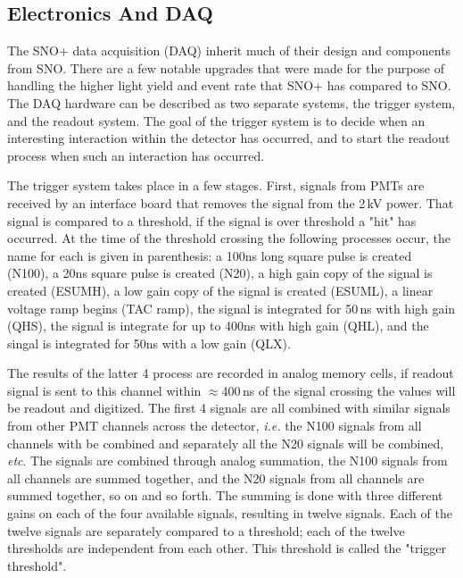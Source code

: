 \subsection{Electronics And DAQ}
The SNO+ data acquisition (DAQ) inherit much of their design and components from
SNO.
There are a few notable upgrades that were made for the purpose of handling the
higher light yield and event rate that SNO+ has compared to SNO.
The DAQ hardware can be described as two separate systems, the trigger system,
and the readout system.
The goal of the trigger system is to decide when an interesting interaction
within the detector has occurred, and to start the readout process when such an
interaction has occurred.

The trigger system takes place in a few stages.
First, signals from PMTs are received by an interface board that
removes the signal from the 2\,kV power.
That signal is compared to a threshold, if the signal is over threshold a "hit"
has occurred.
At the time of the threshold crossing the following processes occur, the name for each is given
in parenthesis:
a 100ns long square pulse is created (N100), a 20ns square pulse is created (N20),
a high gain copy of the signal is created (ESUMH), a low gain copy of the signal
is created (ESUML), a linear voltage ramp begins (TAC ramp), the signal is integrated for
50\,ns with high gain (QHS), the signal is integrate for up to 400ns with high gain (QHL),
and the singal is integrated for 50ns with a low gain (QLX).

The results of the latter 4 process are recorded in analog memory cells,
if readout signal is sent to this channel within $\approx$400\,ns of the
signal crossing the values will be readout and digitized.
The first 4 signals are all combined with similar signals from
other PMT channels across the detector, \textit{i.e.} the N100 signals
from all channels with be combined and separately all the
N20 signals will be combined, \textit{etc}.
The signals are combined through analog summation, the N100 signals
from all channels are summed together, and the N20 signals from all channels are
summed together, so on and so forth.
The summing is done with three different gains on each of the
four available signals, resulting in twelve signals.
Each of the twelve signals are separately compared to a threshold;
each of the twelve thresholds are independent from each other.
This threshold is called the "trigger threshold".

